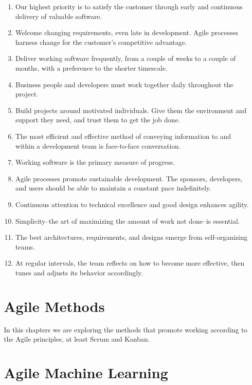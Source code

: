 \documentclass[]{book}
\begin{document}
\begin{enumerate}
\def\labelenumi{\arabic{enumi})}
\item
  Our highest priority is to satisfy the customer through early and continuous delivery of valuable software.
\item
  Welcome changing requirements, even late in development. Agile processes harness change for the customer's competitive advantage.
\item
  Deliver working software frequently, from a couple of weeks to a couple of months, with a preference to the shorter timescale.
\item
  Business people and developers must work together daily throughout the project.
\item
  Build projects around motivated individuals. Give them the environment and support they need, and trust them to get the job done.
\item
  The most efficient and effective method of conveying information to and within a development team is face-to-face conversation.
\item
  Working software is the primary measure of progress.
\item
  Agile processes promote sustainable development. The sponsors, developers, and users should be able to maintain a constant pace indefinitely.
\item
  Continuous attention to technical excellence and good design enhances agility.
\item
  Simplicity--the art of maximizing the amount of work not done--is essential.
\item
  The best architectures, requirements, and designs emerge from self-organizing teams.
\item
  At regular intervals, the team reflects on how to become more effective, then tunes and adjusts its behavior accordingly.
\end{enumerate}

\hypertarget{agile-methods}{%
\chapter{Agile Methods}\label{agile-methods}}

In this chapters we are exploring the methods that promote working according to the Agile principles, at least Scrum and Kanban.

\hypertarget{agile-machine-learning}{%
\chapter{Agile Machine Learning}\label{agile-machine-learning}}
\end{document}
